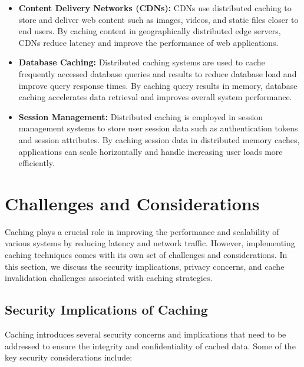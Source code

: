 \documentclass[12pt]{book} %
\begin{document}
\begin{itemize}
    \item \textbf{Content Delivery Networks (CDNs):} CDNs use distributed caching to store and deliver web content such as images, videos, and static files closer to end users. By caching content in geographically distributed edge servers, CDNs reduce latency and improve the performance of web applications.
    
    \item \textbf{Database Caching:} Distributed caching systems are used to cache frequently accessed database queries and results to reduce database load and improve query response times. By caching query results in memory, database caching accelerates data retrieval and improves overall system performance.
    
    \item \textbf{Session Management:} Distributed caching is employed in session management systems to store user session data such as authentication tokens and session attributes. By caching session data in distributed memory caches, applications can scale horizontally and handle increasing user loads more efficiently.
\end{itemize}

\section{Challenges and Considerations}
Caching plays a crucial role in improving the performance and scalability of various systems by reducing latency and network traffic. However, implementing caching techniques comes with its own set of challenges and considerations. In this section, we discuss the security implications, privacy concerns, and cache invalidation challenges associated with caching strategies.

\subsection{Security Implications of Caching}
Caching introduces several security concerns and implications that need to be addressed to ensure the integrity and confidentiality of cached data. Some of the key security considerations include:
\end{document}
